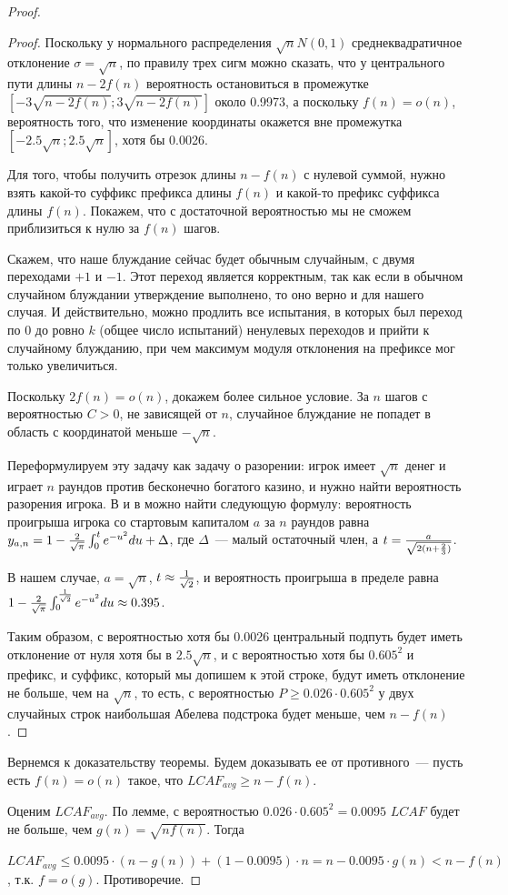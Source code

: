 \begin{proof}
\begin{proof}
Поскольку у нормального распределения $\sqrt {n} N(0,1)$ среднеквадратичное отклонение $\sigma = \sqrt{n}$, по правилу трех сигм можно сказать, что у центрального пути длины $n-2f(n)$ вероятность остановиться в промежутке $[-3\sqrt{n-2f(n)}; 3\sqrt{n-2f(n)}]$ около 0.9973, а поскольку $f(n)=o(n)$, вероятность того, что изменение координаты окажется вне промежутка $[-2.5\sqrt{n}; 2.5\sqrt{n}]$, хотя бы 0.0026.

Для того, чтобы получить отрезок длины $n-f(n)$ с нулевой суммой, нужно взять какой-то суффикс префикса длины $f(n)$ и какой-то префикс суффикса длины $f(n)$. Покажем, что с достаточной вероятностью мы не сможем приблизиться к нулю за $f(n)$ шагов.

Скажем, что наше блуждание сейчас будет обычным случайным, с двумя переходами $+1$ и $-1$. Этот переход является корректным, так как если в обычном случайном блуждании утверждение выполнено, то оно верно и для нашего случая. И действительно, можно продлить все испытания, в которых был переход по 0 до ровно $k$ (общее число испытаний) ненулевых переходов и прийти к случайному блужданию, при чем максимум модуля отклонения на префиксе мог только увеличиться.

Поскольку $2f(n)=o(n)$, докажем более сильное условие. За $n$ шагов с вероятностью $C>0$, не зависящей от $n$, случайное блуждание не попадет в область с координатой меньше $-\sqrt{n}$. 

Переформулируем эту задачу как задачу о разорении: игрок имеет $\sqrt{n}$ денег и играет $n$ раундов против бесконечно богатого казино, и нужно найти вероятность разорения игрока. В \cite{7} и в \cite{8} можно найти следующую формулу: вероятность проигрыша игрока со стартовым капиталом $a$ за $n$ раундов равна $y_{a,n}=1-{{2} \over {\sqrt{\pi}}} \int_0^t e^{-u^2} du + \Delta$, где $\Delta$~--- малый остаточный член, а $t={{a} \over {\sqrt{2(n+{{2}\over 3})}}}$.

В нашем случае, $a=\sqrt n$, $t \approx {1 \over \sqrt 2}$, и вероятность проигрыша в пределе равна $1 - {2 \over \sqrt \pi} \int_0^{1 \over \sqrt 2} e^{-u^2} du \approx 0.395$.

Таким образом, с вероятностью хотя бы 0.0026 центральный подпуть будет иметь отклонение от нуля хотя бы в $2.5\sqrt n$, и с вероятностью хотя бы $0.605^2$ и префикс, и суффикс, который мы допишем к этой строке, будут иметь отклонение не больше, чем на $\sqrt n$, то есть, с вероятностью $P \ge 0.026 \cdot 0.605^2$ у двух случайных строк наибольшая Абелева подстрока будет меньше, чем $n-f(n)$.

\end{proof}

Вернемся к доказательству теоремы. Будем доказывать ее от противного~--- пусть есть $f(n)=o(n)$ такое, что $LCAF_{avg} \ge n - f(n)$. 

Оценим $LCAF_{avg}$. По лемме, с вероятностью $0.026 \cdot 0.605^2 = 0.0095$ $LCAF$ будет не больше, чем $g(n)=\sqrt{nf(n)}$. Тогда

$LCAF_{avg} \le 0.0095 \cdot (n-g(n)) + (1-0.0095)\cdot n = n-0.0095\cdot g(n) < n - f(n)$, т.к. $f=o(g)$. Противоречие.

\end{proof}

